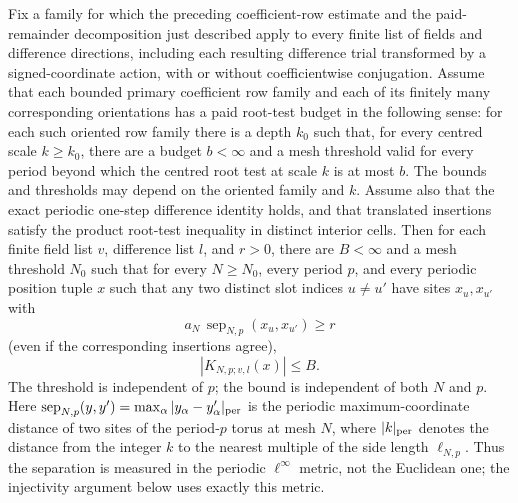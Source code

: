 \begin{theorem}
\label{thm:ex-fullmesh-fixedbounds-producer}
Fix a family for which the preceding coefficient-row estimate and the
paid-remainder decomposition just described apply to every finite list of
fields and difference directions, including each resulting difference trial
transformed by a signed-coordinate action, with or without coefficientwise
conjugation. Assume that each bounded primary coefficient row family and each
of its finitely many corresponding orientations has a paid root-test
budget in the following sense: for each such oriented row family there is a
depth $k_0$ such that, for every centred scale $k\ge k_0$, there are a
budget $b<\infty$ and a mesh threshold valid for every period beyond which
the centred root test at scale $k$ is at most $b$. The bounds and thresholds
may depend on the oriented family and $k$. Assume also that the exact
periodic one-step difference identity holds, and that translated insertions satisfy the product root-test
inequality in distinct interior cells.
Then for each finite field list $v$, difference list $l$, and $r>0$, there
are $B<\infty$ and a mesh threshold $N_0$ such that for every $N\ge N_0$,
every period $p$, and every periodic position tuple $x$ such that any two
distinct slot indices $u\ne u'$ have sites $x_u,x_{u'}$ with
\[
 a_N\,\operatorname{sep}_{N,p}(x_u,x_{u'})\ge r
\]
(even if the corresponding insertions agree),
\begin{equation}
                         |K_{N,p;v,l}(x)|\le B.              \label{eq:ex-fullmesh-bound}
\end{equation}
The threshold is independent of $p$; the bound is independent of both $N$
and $p$. Here $\operatorname{sep}_{N,p}(y,y')=\max_{\alpha}|y_\alpha-y'_\alpha|_{\rm per}$
is the periodic maximum-coordinate distance of two sites of the period-$p$
torus at mesh $N$, where $|k|_{\rm per}$ denotes the distance from the integer
$k$ to the nearest multiple of the side length $\ell_{N,p}$. Thus the
separation is measured in the periodic $\ell^\infty$ metric, not the
Euclidean one; the injectivity argument below uses exactly this metric.
\end{theorem}

